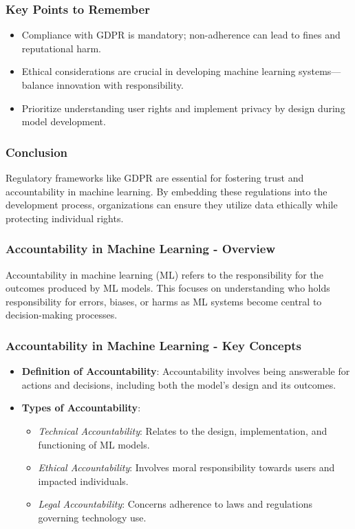 \documentclass[aspectratio=169]{beamer}
\begin{document}
\begin{frame}[fragile]
    \frametitle{Key Points to Remember}
    \begin{itemize}
        \item Compliance with GDPR is mandatory; non-adherence can lead to fines and reputational harm.
        \item Ethical considerations are crucial in developing machine learning systems—balance innovation with responsibility.
        \item Prioritize understanding user rights and implement privacy by design during model development.
    \end{itemize}
\end{frame}

\begin{frame}[fragile]
    \frametitle{Conclusion}
    Regulatory frameworks like GDPR are essential for fostering trust and accountability in machine learning. By embedding these regulations into the development process, organizations can ensure they utilize data ethically while protecting individual rights.
\end{frame}

\begin{frame}[fragile]
    \frametitle{Accountability in Machine Learning - Overview}
    Accountability in machine learning (ML) refers to the responsibility for the outcomes produced by ML models. This focuses on understanding who holds responsibility for errors, biases, or harms as ML systems become central to decision-making processes.
\end{frame}

\begin{frame}[fragile]
    \frametitle{Accountability in Machine Learning - Key Concepts}
    \begin{itemize}
        \item \textbf{Definition of Accountability}:
        Accountability involves being answerable for actions and decisions, including both the model’s design and its outcomes.
        
        \item \textbf{Types of Accountability}:
          \begin{itemize}
              \item \textit{Technical Accountability}: Relates to the design, implementation, and functioning of ML models.
              \item \textit{Ethical Accountability}: Involves moral responsibility towards users and impacted individuals.
              \item \textit{Legal Accountability}: Concerns adherence to laws and regulations governing technology use.
          \end{itemize}
    \end{itemize}
\end{frame}
\end{document}
